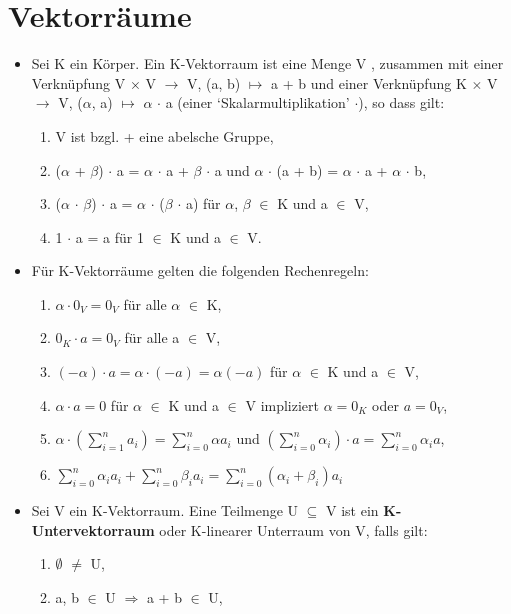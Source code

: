 \section{Vektorräume}
\begin{itemize}
\item Sei K ein Körper. Ein K-Vektorraum ist eine Menge V , zusammen mit einer Verknüpfung V $\times$ V $\to$ V, (a, b) $\mapsto$ a + b und einer Verknüpfung K $\times$ V $\to$ V, ($\alpha$, a) $\mapsto$ $\alpha$ $\cdot$ a (einer ‘Skalarmultiplikation’ $\cdot$), so dass gilt:
\begin{enumerate}
\item V ist bzgl. + eine abelsche Gruppe,
\item ($\alpha$ + $\beta$) $\cdot$ a = $\alpha$ $\cdot$ a + $\beta$ $\cdot$ a und $\alpha$ $\cdot$ (a + b) = $\alpha$ $\cdot$ a + $\alpha$ $\cdot$ b,
\item ($\alpha$ $\cdot$ $\beta$) $\cdot$ a = $\alpha$ $\cdot$ ($\beta$ $\cdot$ a) für $\alpha$, $\beta$ $\in$ K und a $\in$ V,
\item 1 $\cdot$ a = a für 1 $\in$ K und a $\in$ V.
\end{enumerate}
\item Für K-Vektorräume gelten die folgenden Rechenregeln:
\begin{enumerate}
\item $\alpha \cdot 0_V = 0_V$ für alle $\alpha$ $\in$ K,
\item $0_K \cdot a = 0_V$  für alle a $\in$ V,
\item $(-\alpha) \cdot a = \alpha \cdot (-a) = \alpha(-a)$ für $\alpha$ $\in$ K und a $\in$ V,
\item $\alpha \cdot a = 0$ für $\alpha$ $\in$ K und a $\in$ V impliziert $\alpha = 0_K$ oder $a = 0_V$,
\item $\alpha \cdot (\sum\nolimits_{i=1}^{n} a_i) = \sum\nolimits_{i=0}^{n} \alpha a_i$ und $(\sum\nolimits_{i=0}^{n}\alpha_i) \cdot a = \sum\nolimits_{i=0}^{n} \alpha_i a$,
\item $\sum\nolimits_{i=0}^{n} \alpha_i a_i + \sum\nolimits_{i=0}^{n} \beta_i a_i = \sum\nolimits_{i=0}^{n} (\alpha_i + \beta_i) a_i$
\end{enumerate}
\item Sei V ein K-Vektorraum. Eine Teilmenge U $\subseteq$ V ist ein \textbf{K-Untervektorraum} oder K-linearer Unterraum von V, falls gilt:
\begin{enumerate}
\item $\emptyset$ $\neq$ U,
\item a, b $\in$ U $\Rightarrow$ a + b $\in$ U,

\end{enumerate}
\end{itemize}
